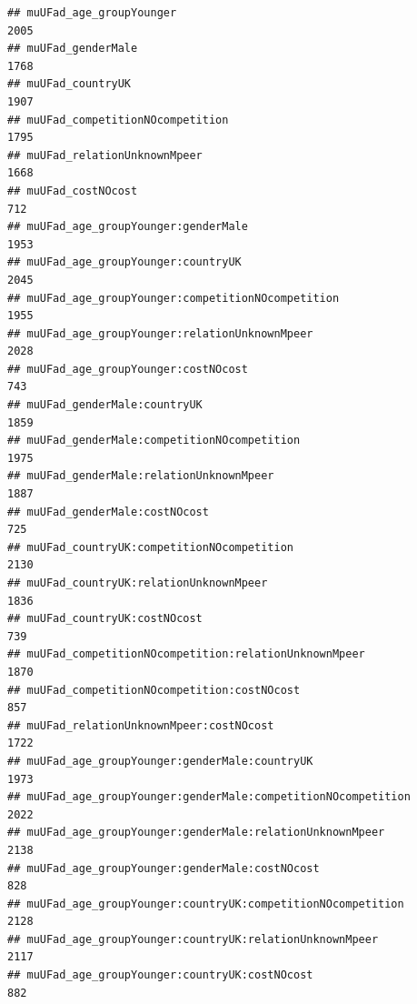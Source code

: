 \documentclass[
]{article}
\begin{document}
\begin{verbatim}
## muUFad_age_groupYounger                                                               2005
## muUFad_genderMale                                                                     1768
## muUFad_countryUK                                                                      1907
## muUFad_competitionNOcompetition                                                       1795
## muUFad_relationUnknownMpeer                                                           1668
## muUFad_costNOcost                                                                      712
## muUFad_age_groupYounger:genderMale                                                    1953
## muUFad_age_groupYounger:countryUK                                                     2045
## muUFad_age_groupYounger:competitionNOcompetition                                      1955
## muUFad_age_groupYounger:relationUnknownMpeer                                          2028
## muUFad_age_groupYounger:costNOcost                                                     743
## muUFad_genderMale:countryUK                                                           1859
## muUFad_genderMale:competitionNOcompetition                                            1975
## muUFad_genderMale:relationUnknownMpeer                                                1887
## muUFad_genderMale:costNOcost                                                           725
## muUFad_countryUK:competitionNOcompetition                                             2130
## muUFad_countryUK:relationUnknownMpeer                                                 1836
## muUFad_countryUK:costNOcost                                                            739
## muUFad_competitionNOcompetition:relationUnknownMpeer                                  1870
## muUFad_competitionNOcompetition:costNOcost                                             857
## muUFad_relationUnknownMpeer:costNOcost                                                1722
## muUFad_age_groupYounger:genderMale:countryUK                                          1973
## muUFad_age_groupYounger:genderMale:competitionNOcompetition                           2022
## muUFad_age_groupYounger:genderMale:relationUnknownMpeer                               2138
## muUFad_age_groupYounger:genderMale:costNOcost                                          828
## muUFad_age_groupYounger:countryUK:competitionNOcompetition                            2128
## muUFad_age_groupYounger:countryUK:relationUnknownMpeer                                2117
## muUFad_age_groupYounger:countryUK:costNOcost                                           882

\end{verbatim}
\end{document}
